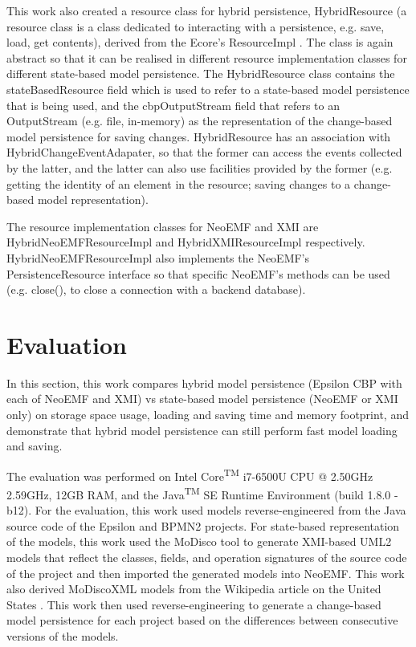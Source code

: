 This work also created a resource class for hybrid persistence, \textsf{HybridResource} (a resource class is a class dedicated to interacting with a persistence, e.g. save, load, get contents), derived from the Ecore's \textsf{ResourceImpl} \cite{eclipse2018resourceImpl}
. The class is again abstract so that it can be realised in different resource implementation classes for different state-based model persistence. The \textsf{HybridResource} class contains the \textsf{stateBasedResource} field which is used to refer to a state-based model persistence that is being used, and the \textsf{cbpOutputStream} field that refers to an \textsf{OutputStream} (e.g. file, in-memory) as the representation of the change-based model persistence for saving changes. \textsf{HybridResource} has an association with \textsf{HybridChangeEventAdapater}, so that the former can access the events collected by the latter, and the latter can also use facilities provided by the former (e.g. getting the identity of an element in the resource; saving changes to a change-based model representation).

The resource implementation classes for NeoEMF and XMI are \textsf{HybridNeoEMFResourceImpl} and \textsf{HybridXMIResourceImpl} respectively. \textsf{HybridNeoEMFResourceImpl} also implements the NeoEMF's \textsf{PersistenceResource} interface \cite{atlanmod2018persistentResource}
so that specific NeoEMF's methods can be used (e.g. \textsf{close}(), to close a connection with a backend database).

\section{Evaluation}
\label{sec:evaluation_5}
In this section, this work compares hybrid model persistence (Epsilon CBP with each of NeoEMF and XMI) vs state-based model persistence (NeoEMF or XMI only) on storage space usage, loading and saving time and memory footprint, and demonstrate that hybrid model persistence can still perform fast model loading and saving. 

The evaluation was performed on Intel\textsuperscript{\textregistered} Core\textsuperscript{TM} i7-6500U CPU @ 2.50GHz 2.59GHz, 12GB RAM, and the Java\textsuperscript{TM} SE Runtime Environment (build 1.8.0 -b12). For the evaluation, this work used models reverse-engineered from the Java source code of the Epsilon \cite{eclipse2017epsilon,eclipse2018epsilongit} and BPMN2 \cite{eclipse2017bpmn2} projects. For state-based representation of the models, this work used the MoDisco tool \cite{DBLP:journals/infsof/BruneliereCDM14} to generate XMI-based UML2 \cite{eclipse2017uml2} models that reflect the classes, fields, and operation signatures of the source code of the project and then imported the generated models into NeoEMF. This work also derived MoDiscoXML models \cite{eclipse2018modiscoxml} from the Wikipedia article on the United States \cite{wikipedia2018us}. This work then used reverse-engineering to generate a change-based model persistence for each project based on the differences between consecutive versions of the models.

